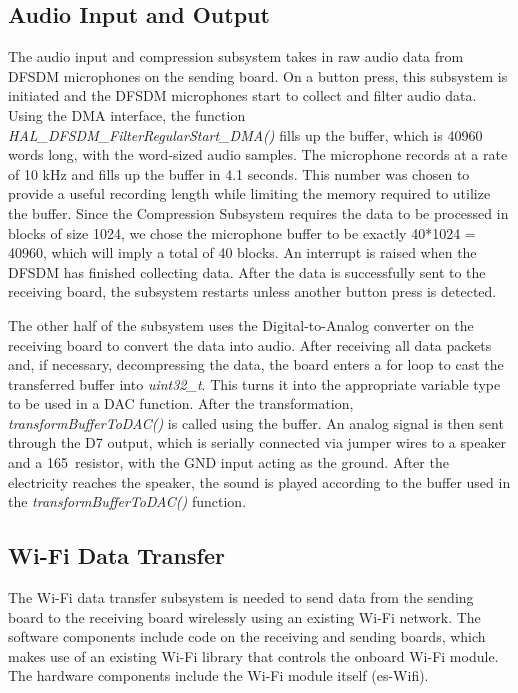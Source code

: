 \documentclass[journal]{IEEEtran}
\begin{document}
\subsection{Audio Input and Output}
The audio input and compression subsystem takes in raw audio data from DFSDM microphones on the sending board. On a button press, this subsystem is initiated and the DFSDM microphones start to collect and filter audio data. Using the DMA interface, the function \textit{HAL\_DFSDM\_FilterRegularStart\_DMA()} fills up the buffer, which is 40960 words long, with the word-sized audio samples. The microphone records at a rate of 10 kHz and fills up the buffer in 4.1 seconds. This number was chosen to provide a useful recording length while limiting the memory required to utilize the buffer. Since the Compression Subsystem requires the data to be processed in blocks of size 1024, we chose the microphone buffer to be exactly 40*1024 = 40960, which will imply a total of 40 blocks. An interrupt is raised when the DFSDM has finished collecting data. After the data is successfully sent to the receiving board, the subsystem restarts unless another button press is detected.

The other half of the subsystem uses the Digital-to-Analog converter on the receiving board to convert the data into audio. After receiving all data packets and, if necessary, decompressing the data, the board enters a for loop to cast the transferred buffer into \textit{uint32\_t}. This turns it into the appropriate variable type to be used in a DAC function. After the transformation, \textit{transformBufferToDAC()} is called using the buffer. An analog signal is then sent through the D7 output, which is serially connected via jumper wires to a speaker and a 165\ohm\ resistor, with the GND input acting as the ground. After the electricity reaches the speaker, the sound is played according to the buffer used in the \textit{transformBufferToDAC()} function.

\subsection{Wi-Fi Data Transfer}
The Wi-Fi data transfer subsystem is needed to send data from the sending board to the receiving board wirelessly using an existing Wi-Fi network. The software components include code on the receiving and sending boards, which makes use of an existing Wi-Fi library that controls the onboard Wi-Fi module. The hardware components include the Wi-Fi module itself (es-Wifi).
\end{document}
